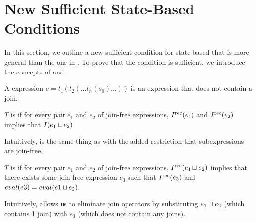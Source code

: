 \section{New Sufficient State-Based Conditions}
In this section, we outline a new sufficient condition for state-based
\Iconfluence{} that is more general than the one in
. To prove that the condition is sufficient, we
introduce the concepts of \dIconfluence{} and \dIreduction{}.

\begin{definition}
  A  expression $e = t_1(t_2(\ldots t_n(s_0) \ldots))$ is an
  expression that does not contain a join.
\end{definition}

\begin{definition}
  $T$ is  if for every pair $e_1$ and $e_2$ of
  join-free expressions, $I^{\text{rec}}(e_1)$ and $I^{\text{rec}}(e_2)$ implies that $I(e_1
  \sqcup e_2)$.
\end{definition}

Intuitively, \dIconfluence{} is the same thing as \Iconfluence{} with
the added restriction that subexpressions are join-free.

\begin{definition}
  $T$ is  if for every pair $e_1$ and $e_2$ of
  join-free expressions, $I^{\text{rec}}(e_1 \sqcup e_2)$ implies that there exists some
  join-free expression $e_3$ such that $I^{\text{rec}}(e_3)$ and $eval(e3) = eval(e1
  \sqcup e_2)$.
\end{definition}

Intuitively, \dIreduction{} allows us to eliminate join operators by
substituting $e_1 \sqcup e_2$ (which contains 1 join) with $e_3$ (which does not
contain any joins).

% 
%

